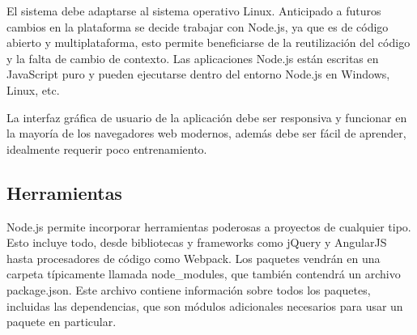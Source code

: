 El sistema debe adaptarse al sistema operativo Linux. Anticipado a futuros cambios en la plataforma se decide trabajar con Node.js, ya que es de código abierto y multiplataforma, esto permite beneficiarse de la reutilización del código y la falta de cambio de contexto. Las aplicaciones Node.js están escritas en JavaScript puro y pueden ejecutarse dentro del entorno Node.js en Windows, Linux, etc.
\vspace{0.8cm}

La interfaz gráfica de usuario de la aplicación debe ser responsiva y funcionar en la mayoría de los navegadores web modernos, además debe ser fácil de aprender, idealmente requerir poco entrenamiento.
\vspace{0.8cm}

\subsection{Herramientas}
Node.js permite incorporar herramientas poderosas a proyectos de cualquier tipo. Esto incluye todo, desde bibliotecas y \glspl{framework} como jQuery y AngularJS hasta procesadores de código como Webpack. Los paquetes vendrán en una carpeta típicamente llamada node\_modules, que también contendrá un archivo package.json. Este archivo contiene información sobre todos los paquetes, incluidas las dependencias, que son módulos adicionales necesarios para usar un paquete en particular.

